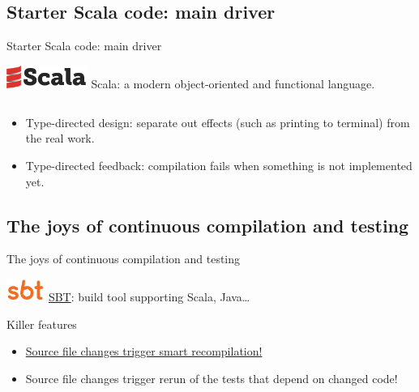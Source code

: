 \subsection{Starter Scala code: main driver}

\begin{frame}[fragile]{Starter Scala code: main driver}
  \begin{block}{\includegraphics[height=0.75cm]{scala-logo-red-dark.png}}
    Scala: a modern \alert{object-oriented} and \alert{functional} language.
  \end{block}

  \inputminted{scala}{Main1.scala}

  \begin{itemize}
  \item Type-directed design: separate out effects (such as printing to terminal) from the real work.
  \item Type-directed feedback: compilation fails when something is not implemented yet.
  \end{itemize}
\end{frame}

\subsection{The joys of continuous compilation and testing}

\begin{frame}[fragile]{The joys of continuous compilation and testing}
  \begin{block}{\includegraphics[height=0.75cm]{sbt-logo-orange-600x360.png}}
    \href{http://www.scala-sbt.org/}{SBT}: build tool supporting Scala, Java\dots
  \end{block}

  \begin{block}{Killer features}
    \begin{itemize}
    \item \href{http://www.scala-sbt.org/release/docs/Detailed-Topics/Triggered-Execution.html}{Source file changes trigger smart recompilation!}
    \item Source file changes trigger rerun of the tests that depend on changed code!
    \end{itemize}
  \end{block}

  \inputminted{console}{testQuick.console}
\end{frame}

